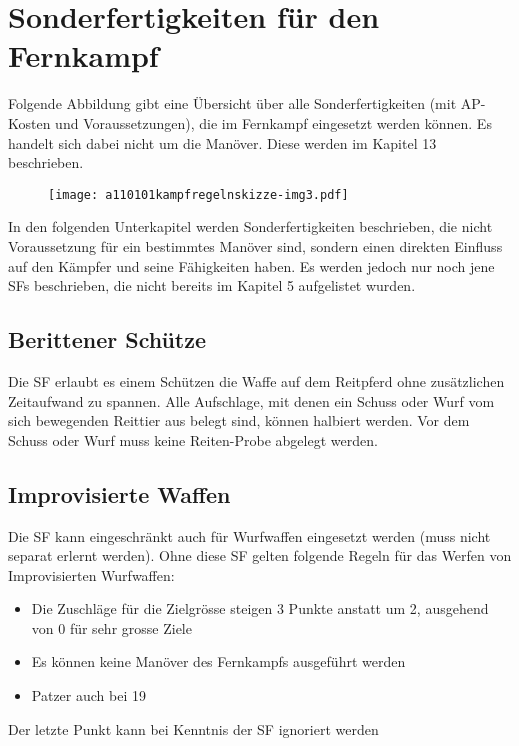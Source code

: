 %


\section[Sonderfertigkeiten für den Fernkampf]{\color{black}
Sonderfertigkeiten für den Fernkampf}
{\sffamily\color{black}
Folgende Abbildung gibt eine Übersicht über alle Sonderfertigkeiten (mit
AP-Kosten und Voraussetzungen), die im Fernkampf eingesetzt werden
können. Es handelt sich dabei nicht um die Manöver. Diese werden im
Kapitel 13 beschrieben.}


\bigskip



\begin{figure}
\centering
\texttt{[image: a110101kampfregelnskizze-img3.pdf]}
\end{figure}
{\sffamily\color{black}
In den folgenden Unterkapitel werden Sonderfertigkeiten beschrieben, die
nicht Voraussetzung für ein bestimmtes Manöver sind, sondern einen
direkten Einfluss auf den Kämpfer und seine Fähigkeiten haben. Es
werden jedoch nur noch jene SFs beschrieben, die nicht bereits im
Kapitel 5 aufgelistet wurden.}

\subsection{Berittener Schütze}
{\sffamily\color{black}
Die SF  erlaubt es einem
Schützen die Waffe auf dem Reitpferd ohne zusätzlichen Zeitaufwand zu
spannen. Alle Aufschlage, mit denen ein Schuss oder Wurf vom sich
bewegenden Reittier aus belegt sind, können halbiert werden. Vor dem
Schuss oder Wurf muss keine Reiten-Probe abgelegt werden.}

\subsection{Improvisierte Waffen}
{\sffamily\color{black}
Die SF  kann eingeschränkt
auch für Wurfwaffen eingesetzt werden (muss nicht separat erlernt
werden). Ohne diese SF gelten folgende Regeln für das Werfen von
Improvisierten Wurfwaffen:}

\liststyleLvi
\begin{itemize}
\item {\sffamily\color{black}
Die Zuschläge für die Zielgrösse steigen 3 Punkte anstatt um 2,
ausgehend von 0 für sehr grosse Ziele}
\item {\sffamily\color{black}
Es können keine Manöver des Fernkampfs ausgeführt werden}
\item {\sffamily\color{black}
Patzer auch bei 19}
\end{itemize}
{\sffamily\color{black}
Der letzte Punkt kann bei Kenntnis der SF
 ignoriert werden}

